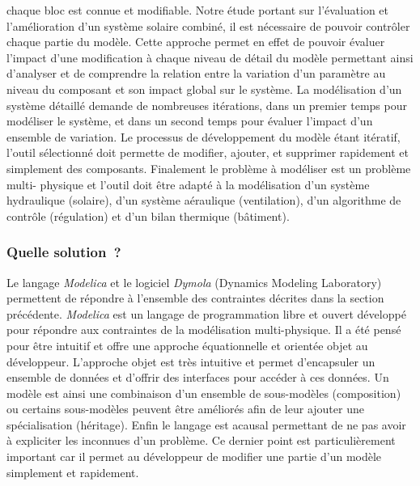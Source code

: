 chaque bloc est connue et modifiable. Notre étude portant sur l’évaluation et
l’amélioration d’un système solaire combiné, il est nécessaire de pouvoir contrôler chaque
partie du modèle. Cette approche permet en effet de pouvoir évaluer l’impact d’une
modification à chaque niveau de détail du modèle permettant ainsi d’analyser et de
comprendre la relation entre la variation d’un paramètre au niveau du composant et son
impact global sur le système. La modélisation d’un système détaillé demande de nombreuses
itérations, dans un premier temps pour modéliser le système, et dans un second temps pour
évaluer l’impact d’un ensemble de variation. Le processus de développement du modèle étant
itératif, l’outil sélectionné doit permette de modifier, ajouter, et supprimer rapidement
et simplement des composants. Finalement le problème à modéliser est un problème multi-
physique et l’outil doit être adapté à la modélisation d’un système hydraulique (solaire),
d’un système aéraulique (ventilation), d’un algorithme de contrôle (régulation) et d’un
bilan thermique (bâtiment).


\subsubsection{Quelle solution~?} %
\label{ssub:quelle_solution}
Le langage \textit{Modelica} et le logiciel \textit{Dymola} (Dynamics Modeling Laboratory) permettent de
répondre à l’ensemble des contraintes décrites dans la section précédente. \textit{Modelica} est un
langage de programmation libre et ouvert développé pour répondre aux contraintes de la
modélisation multi-physique. Il a été pensé pour être intuitif et offre une approche
équationnelle et orientée objet au développeur. L’approche objet est très intuitive et
permet d’encapsuler un ensemble de données et d’offrir des interfaces pour accéder à ces
données. Un modèle est ainsi une combinaison d’un ensemble de sous-modèles (composition)
ou certains sous-modèles peuvent être améliorés afin de leur ajouter une spécialisation
(héritage). Enfin le langage est acausal permettant de ne pas avoir à expliciter les
inconnues d’un problème. Ce dernier point est particulièrement important car il permet au
développeur de modifier une partie d’un modèle simplement et rapidement.

